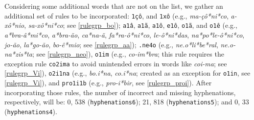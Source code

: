


Considering some additional words that are not on the list, we gather an additional set of rules to 
be incorporated: 
\texttt{1çô}, and \texttt{1xô} (e.g., \emph{ma-çô*ni*co}, \emph{a-xô*nio}, \emph{sa-xô*ni*co}; see \cref{rulegrp_bo});
\texttt{a1â}, \texttt{a1ã}, \texttt{a1ô}, \texttt{e1ô}, \texttt{o1ã}, and \texttt{o1ê} (e.g., \emph{a*bra-â*mi*co}, \emph{a*bra-ão}, \emph{ca*na-ã}, \emph{fa*ra-ô*ni*co}, \emph{le-ô*ni*das}, \emph{na*po*le-ô*ni*co}, \emph{jo-ão}, \emph{la*go-ão}, \emph{bo-ê*mio}; see \cref{rulegrp_aa}); 
\texttt{.ne4o} (e.g., \emph{ne.o*li*be*ral}, \emph{ne.o-na*zis*ta}; see \cref{rulegrp_neo}),
\texttt{o1im} (e.g., \emph{co-im*bra}; this rule requires the exception rule \texttt{co2ima} to avoid unintended errors in words like \emph{coi-ma}; see \cref{rulegrp_Vi}),
\texttt{o2i1na} (e.g., \emph{bo.i*na}, \emph{co.i*na}; created as an exception for \texttt{o1in}, see \cref{rulegrp_Vi}), and 
\texttt{pro1i1b} (e.g., \emph{pro-i*bir}, see \cref{rulegrp_proi}).
After incorporating those rules, the number of incorrect and missing hyphenations, respectively,
will be: 0, 538 (\texttt{hyphenations6}); 21, 818 (\texttt{hyphenations5}); and 0, 33 (\texttt{hyphenations4}). 


